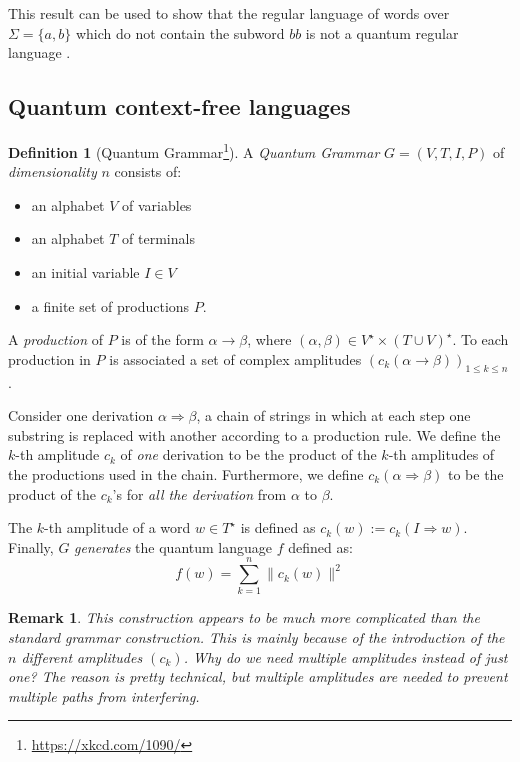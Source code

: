 \documentclass[12pt,a4paper]{article}
\theoremstyle{plain}
\newtheorem*{remark}{Remark}
\theoremstyle{definition}
\newtheorem*{definition}{Definition}
\begin{document}
This result can be used to show that the regular language of words over $\Sigma=\{a, b\}$ which do not contain the subword $bb$ is not a quantum regular language \cite{quantum-automata-grammars}.

\subsection{Quantum context-free languages}
\begin{definition}[Quantum Grammar\footnote{\url{https://xkcd.com/1090/}}]
    A \emph{Quantum Grammar} $G=(V, T, I, P)$ of \emph{dimensionality} $n$ consists of:
    \begin{itemize}[label=--, noitemsep]
        \item an alphabet $V$ of variables
        \item an alphabet $T$ of terminals
        \item an initial variable $I\in V$
        \item a finite set of productions $P$. 
    \end{itemize}
    A \emph{production} of $P$ is of the form $\alpha\to \beta$, where $(\alpha, \beta)\in V^\star\times (T\cup V)^\star$. To each production in $P$ is associated a set of complex amplitudes $\left(c_k(\alpha\to\beta)\right)_{1\leq k\leq n}$.

    Consider one derivation $\alpha\Rightarrow\beta$, a chain of strings in which at each step one substring is replaced with another according to a production rule. We define the $k$-th amplitude $c_k$ of \emph{one} derivation to be the product of the $k$-th amplitudes of the productions used in the chain. Furthermore, we define $c_k(\alpha\Rightarrow\beta)$ to be the product of the $c_k$'s for \emph{all the derivation} from $\alpha$ to $\beta$.

    The $k$-th amplitude of a word $w\in T^\star$ is defined as $c_k(w) := c_k(I\Rightarrow w)$. Finally, $G$ \emph{generates} the quantum language $f$ defined as:
    \begin{equation*}
        f(w) = \sum_{k=1}^n \|c_k(w)\|^2
    \end{equation*}
\end{definition}

\begin{remark}
    This construction appears to be much more complicated than the standard grammar construction. This is mainly because of the introduction of the $n$ different amplitudes $(c_k)$. Why do we need multiple amplitudes instead of just one? The reason is pretty technical, but multiple amplitudes are needed to prevent multiple paths from interfering.
\end{remark}
\end{document}
